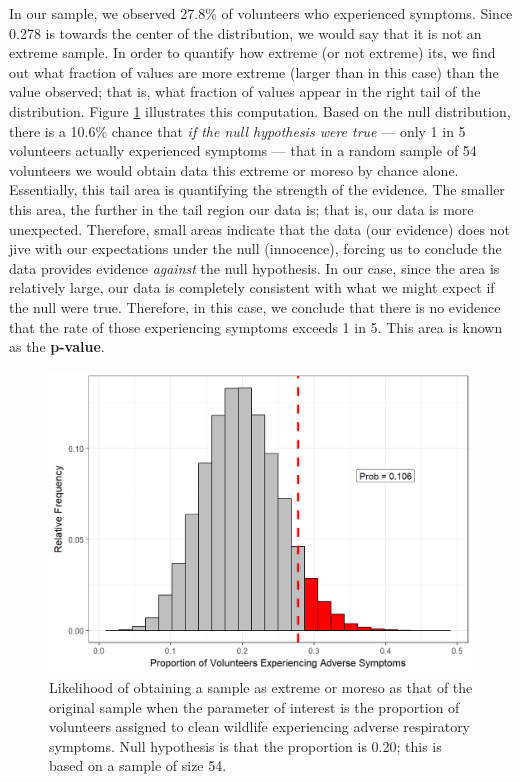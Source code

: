 \documentclass[]{book}
\theoremstyle{definition}
\theoremstyle{definition}
\theoremstyle{definition}
\theoremstyle{remark}
\begin{document}
In our sample, we observed 27.8\% of volunteers who experienced
symptoms. Since 0.278 is towards the center of the distribution, we
would say that it is not an extreme sample. In order to quantify how
extreme (or not extreme) its, we find out what fraction of values are
more extreme (larger than in this case) than the value observed; that
is, what fraction of values appear in the right tail of the
distribution. Figure \ref{fig:nulldistns-deepwater-pvalue} illustrates
this computation. Based on the null distribution, there is a 10.6\%
chance that \emph{if the null hypothesis were true} --- only 1 in 5
volunteers actually experienced symptoms --- that in a random sample of
54 volunteers we would obtain data this extreme or moreso by chance
alone. Essentially, this tail area is quantifying the strength of the
evidence. The smaller this area, the further in the tail region our data
is; that is, our data is more unexpected. Therefore, small areas
indicate that the data (our evidence) does not jive with our
expectations under the null (innocence), forcing us to conclude the data
provides evidence \emph{against} the null hypothesis. In our case, since
the area is relatively large, our data is completely consistent with
what we might expect if the null were true. Therefore, in this case, we
conclude that there is no evidence that the rate of those experiencing
symptoms exceeds 1 in 5. This area is known as the \textbf{p-value}.

\begin{figure}

{\centering \includegraphics[width=0.8\linewidth]{./Images/nulldistns-deepwater-pvalue-1} 

}

\caption{Likelihood of obtaining a sample as extreme or moreso as that of the original sample when the parameter of interest is the proportion of volunteers assigned to clean wildlife experiencing adverse respiratory symptoms.  Null hypothesis is that the proportion is 0.20; this is based on a sample of size 54.}\label{fig:nulldistns-deepwater-pvalue}
\end{figure}
\end{document}
